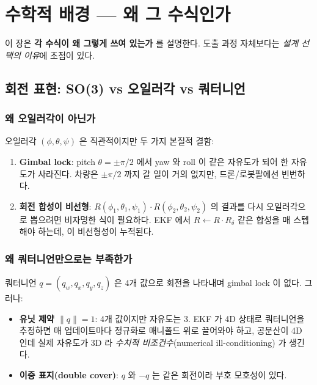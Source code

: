 \documentclass[11pt,a4paper,oneside]{report}
\begin{document}
\chapter{수학적 배경 — 왜 그 수식인가}

이 장은 \textbf{각 수식이 왜 그렇게 쓰여 있는가} 를 설명한다. 도출 과정 자체보다는 \emph{설계 선택의 이유}에 초점이 있다.

\section{회전 표현: SO(3) vs 오일러각 vs 쿼터니언}

\subsection{왜 오일러각이 아닌가}

오일러각 \((\phi, \theta, \psi)\) 은 직관적이지만 두 가지 본질적 결함:
\begin{enumerate}
\item \textbf{Gimbal lock}: pitch \(\theta = \pm \pi/2\) 에서 yaw 와 roll 이 같은 자유도가 되어 한 자유도가 사라진다. 차량은 \(\pm \pi/2\) 까지 갈 일이 거의 없지만, 드론/로봇팔에선 빈번하다.
\item \textbf{회전 합성이 비선형}: \(R(\phi_1, \theta_1, \psi_1) \cdot R(\phi_2, \theta_2, \psi_2)\) 의 결과를 다시 오일러각으로 뽑으려면 비자명한 식이 필요하다. EKF 에서 \(R \leftarrow R \cdot R_\delta\) 같은 합성을 매 스텝 해야 하는데, 이 비선형성이 누적된다.
\end{enumerate}

\subsection{왜 쿼터니언만으로는 부족한가}

쿼터니언 \(q = (q_w, q_x, q_y, q_z)\) 은 4개 값으로 회전을 나타내며 gimbal lock 이 없다. 그러나:
\begin{itemize}
\item \textbf{유닛 제약 \(\|q\| = 1\)}: 4개 값이지만 자유도는 3. EKF 가 4D 상태로 쿼터니언을 추정하면 매 업데이트마다 정규화로 매니폴드 위로 끌어와야 하고, 공분산이 4D 인데 실제 자유도가 3D 라 \emph{수치적 비조건수}(numerical ill-conditioning) 가 생긴다.
\item \textbf{이중 표지(double cover)}: \(q\) 와 \(-q\) 는 같은 회전이라 부호 모호성이 있다.
\end{itemize}
\end{document}
